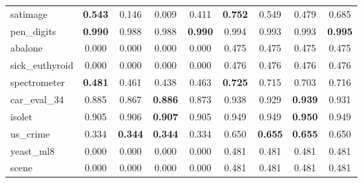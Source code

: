 \begin{figure}[ht]
\begin{tabular}{p{22mm}|*4{p{14mm}}|*4{p{14mm}}}
        satimage&\multicolumn{1}{c}{\textbf{0.543}}&\multicolumn{1}{c}{0.146}&\multicolumn{1}{c}{0.009}&\multicolumn{1}{c|}{0.411}&\multicolumn{1}{c}{\textbf{0.752}}&\multicolumn{1}{c}{0.549}&\multicolumn{1}{c}{0.479}&\multicolumn{1}{c}{0.685}\\
        pen\_digits&\multicolumn{1}{c}{\textbf{0.990}}&\multicolumn{1}{c}{0.988}&\multicolumn{1}{c}{0.988}&\multicolumn{1}{c|}{\textbf{0.990}}&\multicolumn{1}{c}{0.994}&\multicolumn{1}{c}{0.993}&\multicolumn{1}{c}{0.993}&\multicolumn{1}{c}{\textbf{0.995}}\\
        abalone&\multicolumn{1}{c}{0.000}&\multicolumn{1}{c}{0.000}&\multicolumn{1}{c}{0.000}&\multicolumn{1}{c|}{0.000}&\multicolumn{1}{c}{0.475}&\multicolumn{1}{c}{0.475}&\multicolumn{1}{c}{0.475}&\multicolumn{1}{c}{0.475}\\
        sick\_euthyroid&\multicolumn{1}{c}{0.000}&\multicolumn{1}{c}{0.000}&\multicolumn{1}{c}{0.000}&\multicolumn{1}{c|}{0.000}&\multicolumn{1}{c}{0.476}&\multicolumn{1}{c}{0.476}&\multicolumn{1}{c}{0.476}&\multicolumn{1}{c}{0.476}\\
        spectrometer&\multicolumn{1}{c}{\textbf{0.481}}&\multicolumn{1}{c}{0.461}&\multicolumn{1}{c}{0.438}&\multicolumn{1}{c|}{0.463}&\multicolumn{1}{c}{\textbf{0.725}}&\multicolumn{1}{c}{0.715}&\multicolumn{1}{c}{0.703}&\multicolumn{1}{c}{0.716}\\
        car\_eval\_34&\multicolumn{1}{c}{0.885}&\multicolumn{1}{c}{0.867}&\multicolumn{1}{c}{\textbf{0.886}}&\multicolumn{1}{c|}{0.873}&\multicolumn{1}{c}{0.938}&\multicolumn{1}{c}{0.929}&\multicolumn{1}{c}{\textbf{0.939}}&\multicolumn{1}{c}{0.931}\\
        isolet&\multicolumn{1}{c}{0.905}&\multicolumn{1}{c}{0.906}&\multicolumn{1}{c}{\textbf{0.907}}&\multicolumn{1}{c|}{0.905}&\multicolumn{1}{c}{0.949}&\multicolumn{1}{c}{0.949}&\multicolumn{1}{c}{\textbf{0.950}}&\multicolumn{1}{c}{0.949}\\
        us\_crime&\multicolumn{1}{c}{0.334}&\multicolumn{1}{c}{\textbf{0.344}}&\multicolumn{1}{c}{\textbf{0.344}}&\multicolumn{1}{c|}{0.334}&\multicolumn{1}{c}{0.650}&\multicolumn{1}{c}{\textbf{0.655}}&\multicolumn{1}{c}{\textbf{0.655}}&\multicolumn{1}{c}{0.650}\\
        yeast\_ml8&\multicolumn{1}{c}{0.000}&\multicolumn{1}{c}{0.000}&\multicolumn{1}{c}{0.000}&\multicolumn{1}{c|}{0.000}&\multicolumn{1}{c}{0.481}&\multicolumn{1}{c}{0.481}&\multicolumn{1}{c}{0.481}&\multicolumn{1}{c}{0.481}\\
        scene&\multicolumn{1}{c}{0.000}&\multicolumn{1}{c}{0.000}&\multicolumn{1}{c}{0.000}&\multicolumn{1}{c|}{0.000}&\multicolumn{1}{c}{0.481}&\multicolumn{1}{c}{0.481}&\multicolumn{1}{c}{0.481}&\multicolumn{1}{c}{0.481}\\

\end{tabular}
\end{figure}
